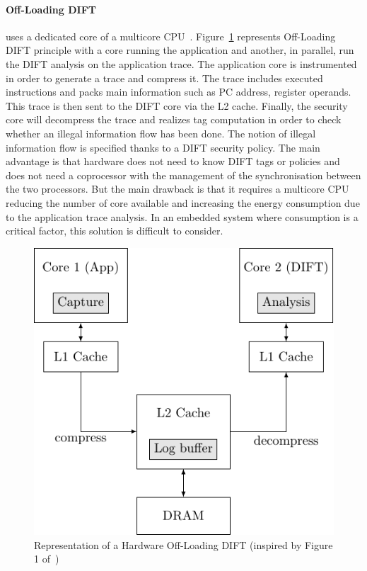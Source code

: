 \paragraph{Off-Loading DIFT} uses a dedicated core of a multicore CPU~\cite{CKSFGMRRRV-08-sigarch,VHYR-08-cca,RGMRCKR-08-spaa}. Figure~\ref{fig:offloading_dift} represents Off-Loading DIFT principle with a core running the application and another, in parallel, run the DIFT analysis on the application trace. The application core is instrumented in order to generate a trace and compress it. The trace includes executed instructions and packs main information such as PC address, register operands. This trace is then sent to the DIFT core via the L2 cache. Finally, the security core will decompress the trace and realizes tag computation in order to check whether an illegal information flow has been done. The notion of illegal information flow is specified thanks to a DIFT security policy.
The main advantage is that hardware does not need to know DIFT tags or policies and does not need a coprocessor with the management of the synchronisation between the two processors.  But the main drawback is that it requires a multicore CPU reducing the number of core available and increasing the energy consumption due to the application trace analysis. In an embedded system where consumption is a critical factor, this solution is difficult to consider.

\begin{figure}[ht]
    \centering
    \includegraphics{c2_soa/img/offloading.pdf}
    \caption{Representation of a Hardware Off-Loading DIFT (inspired by Figure 1 of~\cite{KDK-09-dsn})}
    \label{fig:offloading_dift}
\end{figure}

